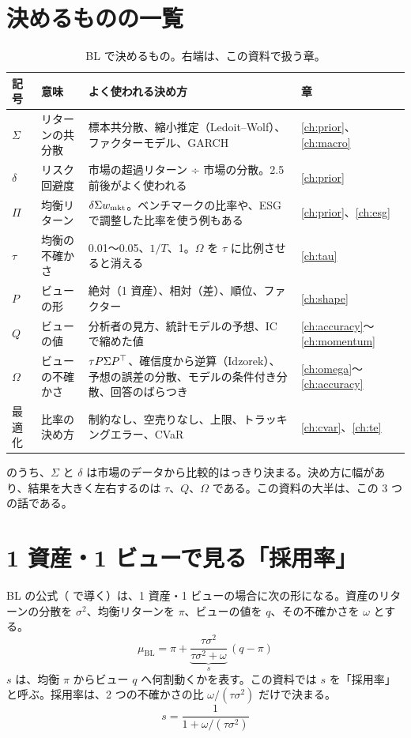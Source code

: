 \section{決めるものの一覧}

\begin{table}[htbp]
\centering
\caption{BL で決めるもの。右端は、この資料で扱う章。}
\label{tab:knobs}
\small
\begin{tabular}{p{1.4cm}p{2.9cm}p{6.2cm}p{2.0cm}}
\toprule
記号 & 意味 & よく使われる決め方 & 章 \\
\midrule
$\Sigma$ & リターンの共分散 & 標本共分散、縮小推定（Ledoit--Wolf）、ファクターモデル、GARCH & \ref{ch:prior}、\ref{ch:macro} \\
$\delta$ & リスク回避度 & 市場の超過リターン ÷ 市場の分散。2.5 前後がよく使われる & \ref{ch:prior} \\
$\Pi$ & 均衡リターン & $\delta\Sigma w_{\mathrm{mkt}}$。ベンチマークの比率や、ESG で調整した比率を使う例もある & \ref{ch:prior}、\ref{ch:esg} \\
$\tau$ & 均衡の不確かさ & 0.01〜0.05、$1/T$、1。$\Omega$ を $\tau$ に比例させると消える & \ref{ch:tau} \\
$P$ & ビューの形 & 絶対（1 資産）、相対（差）、順位、ファクター & \ref{ch:shape} \\
$Q$ & ビューの値 & 分析者の見方、統計モデルの予想、IC で縮めた値 & \ref{ch:accuracy}〜\ref{ch:momentum} \\
$\Omega$ & ビューの不確かさ & $\tau P\Sigma P^{\top}$、確信度から逆算（Idzorek）、予想の誤差の分散、モデルの条件付き分散、回答のばらつき & \ref{ch:omega}〜\ref{ch:accuracy} \\
最適化 & 比率の決め方 & 制約なし、空売りなし、上限、トラッキングエラー、CVaR & \ref{ch:cvar}、\ref{ch:te} \\
\bottomrule
\end{tabular}
\end{table}

 のうち、$\Sigma$ と $\delta$ は市場のデータから比較的はっきり決まる。決め方に幅があり、結果を大きく左右するのは $\tau$、$Q$、$\Omega$ である。この資料の大半は、この 3 つの話である。

\section{1 資産・1 ビューで見る「採用率」}\label{sec:adoption}

BL の公式（ で導く）は、1 資産・1 ビューの場合に次の形になる。資産のリターンの分散を $\sigma^2$、均衡リターンを $\pi$、ビューの値を $q$、その不確かさを $\omega$ とする。
\begin{equation}
\mu_{\mathrm{BL}}=\pi+\underbrace{\frac{\tau\sigma^2}{\tau\sigma^2+\omega}}_{s}\,(q-\pi)
\label{eq:scalar}
\end{equation}
$s$ は、均衡 $\pi$ からビュー $q$ へ何割動くかを表す。この資料では $s$ を「採用率」と呼ぶ。採用率は、2 つの不確かさの比 $\omega/(\tau\sigma^2)$ だけで決まる。
\begin{equation}
s=\frac{1}{1+\omega/(\tau\sigma^2)}
\label{eq:adoption}
\end{equation}

